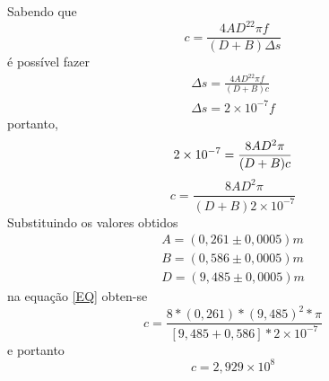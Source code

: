 Sabendo que
\begin{equation}
	c = \frac{4AD^22\pi f}{(D+B)\Delta s}
\end{equation}
é possível fazer
\begin{equation}
\begin{split}
	\Delta s = \frac{4AD^22\pi f}{(D+B)c}\\
	\Delta s = 2\times10^{-7}f
\end{split}
\end{equation}
portanto,
\begin{equation}
	2\times10^{-7}=\frac{8AD^2\pi}{(D+B)c}\\
\end{equation}
\begin{equation}
	c=\frac{8AD^2\pi}{(D+B)2\times10^{-7}}
\label{EQ}
\end{equation}
Substituindo os valores obtidos
\begin{equation}
	\begin{split}
		A = (0,261\pm0,0005)m\\
		B = (0,586\pm0,0005)m\\
		D = (9,485\pm0,0005)m
	\end{split}
\end{equation}
na equação \ref{EQ} obten-se
\begin{equation}
	c=\frac{8*(0,261)*(9,485)^2*\pi}{[9,485+0,586]*2\times10^{-7}}
\end{equation}
e portanto
\begin{equation}
	c=2,929\times10^{8}
\end{equation}
